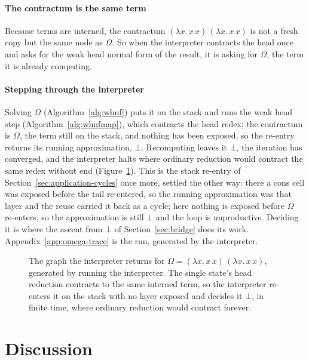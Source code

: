 \paragraph{The contractum is the same term}
Because terms are interned, the contractum $(\lambda x.\,x\,x)\,(\lambda x.\,x\,x)$ is not a fresh copy but the same node as $\Omega$. So when the interpreter contracts the head once and asks for the weak head normal form of the result, it is asking for $\Omega$, the term it is already computing.

\paragraph{Stepping through the interpreter}
Solving $\Omega$ (Algorithm~\ref{alg:whnf}) puts it on the stack and runs the weak head step (Algorithm~\ref{alg:whnfmap}), which contracts the head redex; the contractum is $\Omega$, the term still on the stack, and nothing has been exposed, so the re-entry returns its running approximation, $\bot$. Recomputing leaves it $\bot$, the iteration has converged, and the interpreter halts where ordinary reduction would contract the same redex without end (Figure~\ref{fig:omega}). This is the stack re-entry of Section~\ref{sec:application-cycles} once more, settled the other way: there a cons cell was exposed before the tail re-entered, so the running approximation was that layer and the reuse carried it back as a cycle; here nothing is exposed before $\Omega$ re-enters, so the approximation is still $\bot$ and the loop is unproductive. Deciding it is where the ascent from $\bot$ of Section~\ref{sec:bridge} does its work. Appendix~\ref{app:omega-trace} is the run, generated by the interpreter.

\begin{figure}
  \centering
  
  \caption{The graph the interpreter returns for $\Omega = (\lambda x.\,x\,x)\,(\lambda x.\,x\,x)$, generated by running
    the interpreter. The single state's head reduction contracts to the same interned term, so the interpreter
    re-enters it on the stack with no layer exposed and decides it $\bot$, in finite time, where ordinary
  reduction would contract forever.}
  \label{fig:omega}
\end{figure}

\section{Discussion}\label{sec:discussion}

